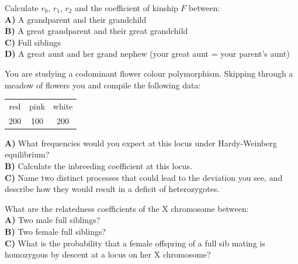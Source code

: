 {{\begin{question}{}
Calculate $r_{0}$, $r_{1}$, $r_{2}$ and the coefficient of kinship $F$ between:\\
{\bf A)} A grandparent and their grandchild\\
{\bf B)} A great grandparent and their great grandchild\\
{\bf C)} Full siblings\\
{\bf D)} A great aunt and her grand nephew (your great aunt = your parent's aunt)\\
\end{question}

\begin{question}{}
You are studying a codominant flower colour polymorphism. Skipping
through a meadow of flowers you and compile the following data:
\begin{center}
\begin{tabular}{ccc}
red & pink & white\\
200 & 100 & 200\\
\end{tabular}
\end{center}
{\bf A)} What frequencies would you expect at this locus under Hardy-Weinberg equilibrium? \\
{\bf B)} Calculate the inbreeding coefficient at this locus.\\ 
{\bf C)} Name two distinct processes that could lead to the deviation
you see, and describe how they would result in a deficit of heterozygotes.
\end{question}



\begin{question}{}
What are the relatedness coefficients of the X chromosome between:\\
{\bf A)} Two male full siblings?\\
{\bf B)} Two female full siblings?\\
{\bf C)} What is the probability that a female offspring of a full sib
mating is homozygous by descent at a locus on her X chromosome?
\end{question}

}}
